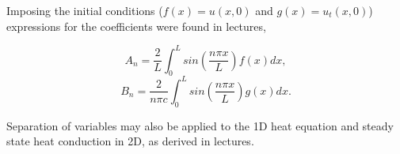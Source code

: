 \documentclass[12pt]{article}
\begin{document}
\vspace{4mm}

Imposing the initial conditions ($f(x)=u(x,0)$ and $g(x)=u_t(x,0)$)  expressions for the coefficients were found in lectures,

\vspace{2mm}

$$ A_n = \frac{2}{L} \int_0^L sin\left(\frac{n\pi x}{L}\right) f(x) dx,  $$
\vspace{2mm}
$$ B_n = \frac{2}{n\pi c} \int_0^L sin\left(\frac{n\pi x}{L}\right) g(x) dx.  $$

\vspace{4mm}

Separation of variables may also be applied to the 1D heat equation and steady state heat conduction in 2D, as derived in lectures.
\end{document}

